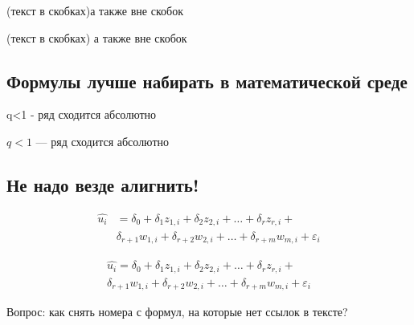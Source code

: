 \documentclass[12pt, a4paper]{article}
\begin{document}
(текст в скобках)а также вне скобок

(текст в скобках) а также вне скобок


\subsection{Формулы лучше набирать в математической среде}

q<1 - ряд сходится абсолютно 

$q < 1$ --- ряд сходится абсолютно 


\subsection{Не надо везде алигнить!}



  \begin{align}
\hat{u_i} &=\delta_0+\delta_1 z_{1,i} + \delta_2 z_{2,i}+ \ldots + \delta_r z_{r,i}+ \\
& \delta_{r+1} w_{1,i} + \delta_{r+2} w_{2,i} + \ldots + \delta_{r+m} w_{m,i} +\varepsilon_i  
 \tag{æææææ}
  \end{align} 

\vspace{5mm}


\vspace{5mm}

  \begin{multline}
\hat{u_i} =\delta_0+\delta_1 z_{1,i} + \delta_2 z_{2,i}+ \ldots + \delta_r z_{r,i}+ \\
 \delta_{r+1} w_{1,i} + \delta_{r+2} w_{2,i} + \ldots + \delta_{r+m} w_{m,i} +\varepsilon_i  
 \tag{æææææ}
  \end{multline} 
  
 Вопрос: как снять номера с формул, на которые нет ссылок в тексте? 
\end{document}

